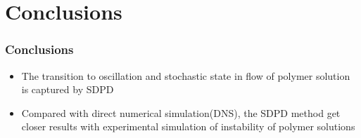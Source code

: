 \section{Conclusions}
\begin{frame}
  \frametitle{Conclusions}
  \begin{itemize}
  \item The transition to oscillation and stochastic state in flow of polymer solution is captured by SDPD
  \item Compared with direct numerical simulation(DNS),
the SDPD method get closer results with experimental simulation of instability of polymer solutions
  \end{itemize}
\end{frame}
